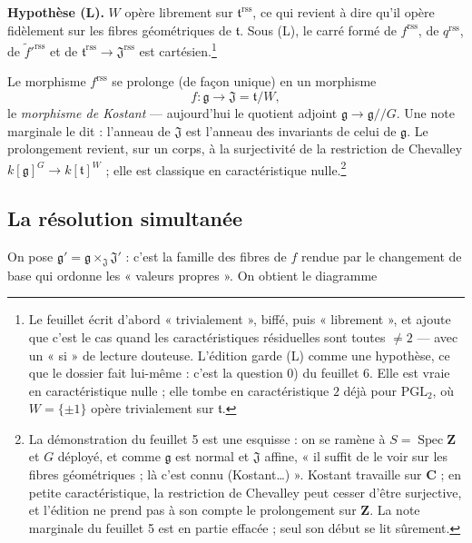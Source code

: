 \documentclass[11pt,a4paper]{article}
\begin{document}
\textbf{Hypothèse (L).} $W$ opère librement sur
$\mathfrak{t}^{\mathrm{rss}}$, ce qui revient à dire qu'il opère fidèlement sur
les fibres géométriques de $\mathfrak{t}$. Sous (L), le carré formé de
$f^{\mathrm{rss}}$, de $q^{\mathrm{rss}}$, de
$\tilde f'^{\mathrm{rss}}$ et de $\mathfrak{t}^{\mathrm{rss}}\to
\mathfrak{J}^{\mathrm{rss}}$ est cartésien.\footnote{Le feuillet écrit d'abord
« trivialement », biffé, puis « librement », et ajoute que c'est le cas quand
les caractéristiques résiduelles sont toutes $\neq 2$ — avec un « si » de
lecture douteuse. L'édition garde (L) comme une hypothèse, ce que le dossier
fait lui-même : c'est la question 0) du feuillet 6. Elle est vraie en
caractéristique nulle ; elle tombe en caractéristique $2$ déjà pour
$\mathrm{PGL}_{2}$, où $W=\{\pm 1\}$ opère trivialement sur $\mathfrak{t}$.}

Le morphisme $f^{\mathrm{rss}}$ se prolonge (de façon unique) en un morphisme
\[
  f\colon\mathfrak{g}\longrightarrow\mathfrak{J}=\mathfrak{t}/W,
\]
le \emph{morphisme de Kostant} — aujourd'hui le quotient adjoint
$\mathfrak{g}\to\mathfrak{g}/\!\!/G$. Une note marginale le dit : l'anneau de
$\mathfrak{J}$ est l'anneau des invariants de celui de $\mathfrak{g}$. Le
prolongement revient, sur un corps, à la surjectivité de la restriction de
Chevalley $k[\mathfrak{g}]^{G}\to k[\mathfrak{t}]^{W}$ ; elle est classique en
caractéristique nulle.\footnote{La démonstration du feuillet 5 est une
esquisse : on se ramène à $S=\operatorname{Spec}\mathbf{Z}$ et $G$ déployé, et
comme $\mathfrak{g}$ est normal et $\mathfrak{J}$ affine, « il suffit de le voir
sur les fibres géométriques ; là c'est connu (Kostant…) ». Kostant travaille
sur $\mathbf{C}$ ; en petite caractéristique, la restriction de Chevalley peut
cesser d'être surjective, et l'édition ne prend pas à son compte le
prolongement sur $\mathbf{Z}$. La note marginale du feuillet 5 est en partie
effacée ; seul son début se lit sûrement.}

\subsection*{La résolution simultanée}

On pose $\mathfrak{g}'=\mathfrak{g}\times_{\mathfrak{J}}\mathfrak{J}'$ :
c'est la famille des fibres de $f$ rendue par le changement de base qui ordonne
les « valeurs propres ». On obtient le diagramme

\end{document}
